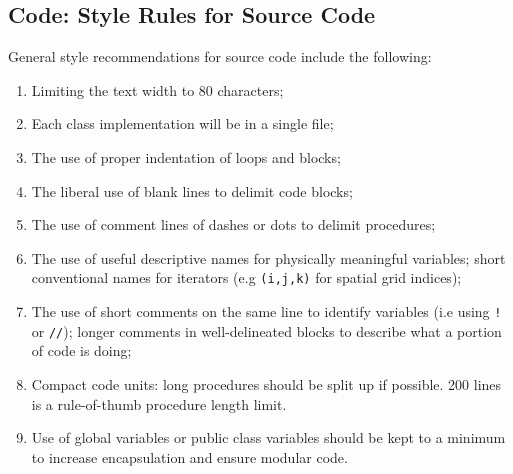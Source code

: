 \subsection{Code: Style Rules for Source Code}

General style recommendations for source code include the following:

\begin{enumerate}
\item Limiting the text width to 80 characters;
\item Each class implementation will be in a single file;
\item The use of proper indentation of loops and blocks;
\item The liberal use of blank lines to delimit code blocks;
\item The use of comment lines of dashes or dots to delimit
  procedures;
\item The use of useful descriptive names for physically meaningful
  variables; short conventional names for iterators (e.g
  \texttt{(i,j,k)} for spatial grid indices);
\item The use of short comments on the same line to identify variables
  (i.e using \texttt{!} or \texttt{//}); longer comments in
  well-delineated blocks to describe what a portion of code is doing;
\item Compact code units: long procedures should be split up if
  possible. 200 lines is a rule-of-thumb procedure length limit.
\item Use of global variables or public class variables should be
kept to a minimum to increase encapsulation and ensure modular code.
\end{enumerate}















